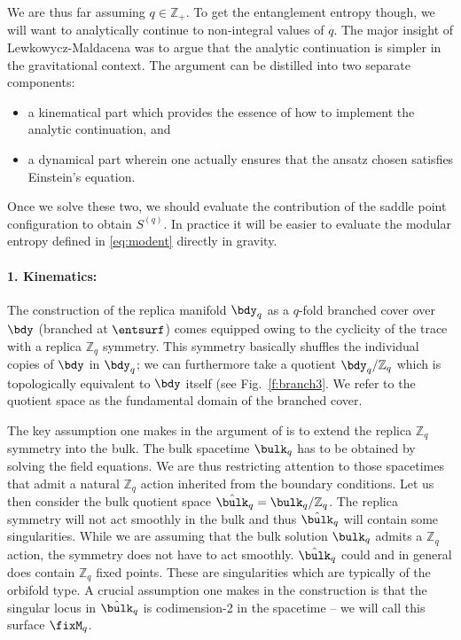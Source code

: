 \documentclass[12pt,openany]{book}
\begin{document}
We are thus far assuming $q\in {\mathbb Z}_+$. To get the entanglement entropy though, we will want to analytically continue to non-integral values of $q$. The major insight of Lewkowycz-Maldacena \cite{Lewkowycz:2013nqa} was to argue that the analytic continuation is simpler in the gravitational context. The argument can be distilled into two separate components:
\begin{itemize}
\item a kinematical part which provides the essence of how to implement the analytic continuation, and
\item a dynamical part wherein one actually ensures that the ansatz chosen satisfies Einstein's equation.
\end{itemize}
Once we solve these two, we should evaluate the contribution of the saddle point configuration to obtain $S^{(q)}$. In practice it will be easier to evaluate the modular entropy defined in \eqref{eq:modent} directly in gravity.

\paragraph{1. Kinematics:} The construction of the replica manifold $\bdy_q$ as a $q$-fold branched cover over $\bdy$ (branched at $\entsurf$) comes equipped owing to the cyclicity of the trace with a replica ${\mathbb Z}_q$ symmetry. This symmetry basically shuffles the individual copies of $\bdy$ in $\bdy_q$; we can furthermore take a quotient  $\bdy_q/{\mathbb Z}_q$ which is topologically equivalent to $\bdy$ itself (see Fig.~\ref{f:branch3}. We refer to the quotient space as the fundamental domain of the branched cover.

 The key assumption one makes in the argument of \cite{Lewkowycz:2013nqa} is to extend the replica ${\mathbb Z}_q$ symmetry  into the bulk. The bulk spacetime $\bulk_q$ has to be obtained by solving the field equations. We are thus restricting attention to those spacetimes that  admit a natural ${\mathbb Z}_q$ action inherited from the boundary conditions. Let us then consider the bulk quotient space ${\hat \bulk}_q = \bulk_q/{\mathbb Z}_q$.
  The replica symmetry will not act  smoothly in the bulk and thus ${\hat \bulk}_q $ will contain some singularities.
  While we are assuming that the bulk solution $\bulk_q$ admits a ${\mathbb Z}_q$ action, the symmetry does not have to act smoothly.  ${\hat \bulk}_q$ could and in general does contain ${\mathbb Z} _q$ fixed points. These are singularities which are typically of the orbifold type. A crucial assumption one makes in the construction is that the singular locus in
${\hat \bulk}_q $ is codimension-2 in the spacetime -- we will call this surface $\fixM_q$.
\end{document}
